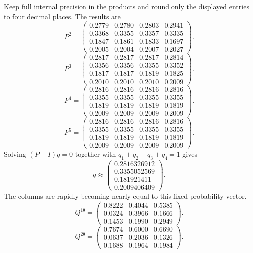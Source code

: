 Keep full internal precision in the products and round only the displayed
entries to four decimal places. The results are
\[ P^{2}=\begin{pmatrix}0.2779&0.2780&0.2803&0.2941\\0.3368&0.3355&0.3357&0.3335\\0.1847&0.1861&0.1833&0.1697\\0.2005&0.2004&0.2007&0.2027\end{pmatrix}.\]
\[ P^{3}=\begin{pmatrix}0.2817&0.2817&0.2817&0.2814\\0.3356&0.3356&0.3355&0.3352\\0.1817&0.1817&0.1819&0.1825\\0.2010&0.2010&0.2010&0.2009\end{pmatrix}.\]
\[ P^{4}=\begin{pmatrix}0.2816&0.2816&0.2816&0.2816\\0.3355&0.3355&0.3355&0.3355\\0.1819&0.1819&0.1819&0.1819\\0.2009&0.2009&0.2009&0.2009\end{pmatrix}.\]
\[ P^{5}=\begin{pmatrix}0.2816&0.2816&0.2816&0.2816\\0.3355&0.3355&0.3355&0.3355\\0.1819&0.1819&0.1819&0.1819\\0.2009&0.2009&0.2009&0.2009\end{pmatrix}.\]
Solving $(P-I)q=0$ together with $q_1+q_2+q_3+q_4=1$ gives
\[ q\approx\begin{pmatrix}0.2816326912\\0.3355052569\\0.181921411\\0.2009406409\end{pmatrix}.\]
The columns are rapidly becoming nearly equal to this fixed probability vector.
\[ Q^{10}=\begin{pmatrix}0.8222&0.4044&0.5385\\0.0324&0.3966&0.1666\\0.1453&0.1990&0.2949\end{pmatrix}.\]
\[ Q^{20}=\begin{pmatrix}0.7674&0.6000&0.6690\\0.0637&0.2036&0.1326\\0.1688&0.1964&0.1984\end{pmatrix}.\]
